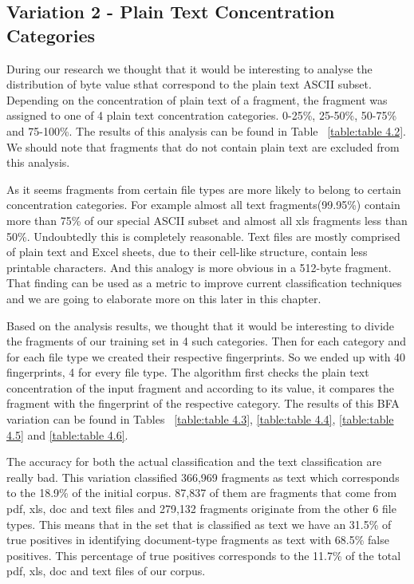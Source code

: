 


\subsection{Variation 2 - Plain Text Concentration Categories}
During our research we thought that it would be interesting to analyse the distribution of byte value sthat correspond to the plain text ASCII subset. Depending on the concentration of plain text of a fragment, the fragment was assigned to one of 4 plain text concentration categories. 0-25\%, 25-50\%, 50-75\% and 75-100\%. The results of this analysis can be found in Table ~\ref{table:table 4.2}. We should note that fragments that do not contain plain text are excluded from this analysis. 

As it seems fragments from certain file types are more likely to belong to certain concentration categories. For example almost all text fragments(99.95\%) contain more than 75\% of our special ASCII subset and almost all xls fragments less than 50\%. Undoubtedly this is completely reasonable. Text files are mostly comprised of plain text and Excel sheets, due to their cell-like structure, contain less printable characters. And this analogy is more obvious in a 512-byte fragment. That finding can be used as a metric to improve current classification techniques and we are going to elaborate more on this later in this chapter.



Based on the analysis results, we thought that it would be interesting to divide the fragments of our training set in 4 such categories. Then for each category and for each file type we created their respective fingerprints. So we ended up with 40 fingerprints, 4 for every file type. The algorithm first checks the plain text concentration of the input fragment and according to its value, it compares the fragment with the fingerprint of the respective category. The results of this BFA variation can be found in Tables ~\ref{table:table 4.3}, \ref{table:table 4.4}, \ref{table:table 4.5} and \ref{table:table 4.6}.

The accuracy for both the actual classification and the text classification are really bad. This variation classified 366,969 fragments as text which corresponds to the 18.9\% of the initial corpus. 87,837 of them are fragments that come from pdf, xls, doc and text files and 279,132 fragments originate from the other 6 file types. This means that in the set that is classified as text we have an 31.5\% of true positives in identifying document-type fragments as text with 68.5\% false positives. This percentage of true positives corresponds to the 11.7\% of the total pdf, xls, doc and text files of our corpus.

